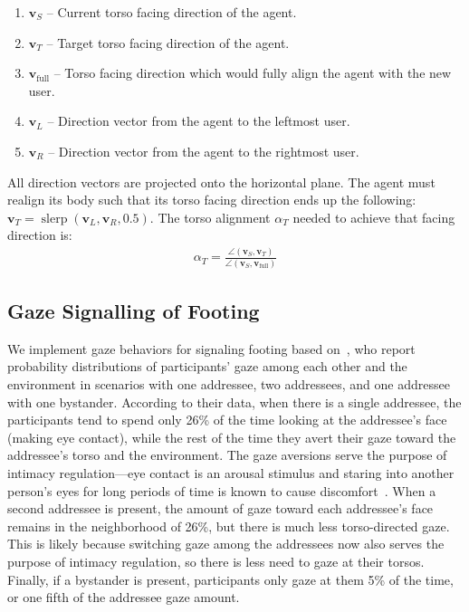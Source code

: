 \begin{enumerate}
\item $\mathbf{v}_S$ -- Current torso facing direction of the agent.
\item $\mathbf{v}_T$ -- Target torso facing direction of the agent.
\item $\mathbf{v}_\mathrm{full}$ -- Torso facing direction which would fully align the agent with the new user.
\item $\mathbf{v}_L$ -- Direction vector from the agent to the leftmost user.
\item $\mathbf{v}_R$ -- Direction vector from the agent to the rightmost user.
\end{enumerate}

All direction vectors are projected onto the horizontal plane. The agent must realign its body such that its torso facing direction ends up the following: $\mathbf{v}_T = \mathop{slerp}(\mathbf{v}_L, \mathbf{v}_R, 0.5)$. The torso alignment $\alpha_T$ needed to achieve that facing direction is:
%
\begin{align} \label{eq:FTorsoAlign}
\alpha_T = \frac{\angle(\mathbf{v}_S, \mathbf{v}_T)}{\angle(\mathbf{v}_S, \mathbf{v}_\mathrm{full})}
\end{align}
%

\subsection{Gaze Signalling of Footing}

We implement gaze behaviors for signaling footing based on~\citet{mutlu2012conversational}, who report probability distributions of participants' gaze among each other and the environment in scenarios with one addressee, two addressees, and one addressee with one bystander. According to their data, when there is a single addressee, the participants tend to spend only 26\% of the time looking at the addressee's face (making eye contact), while the rest of the time they avert their gaze toward the addressee's torso and the environment. The gaze aversions serve the purpose of intimacy regulation---eye contact is an arousal stimulus and staring into another person's eyes for long periods of time is known to cause discomfort~\citep{argyle1976gaze}. When a second addressee is present, the amount of gaze toward each addressee's face remains in the neighborhood of 26\%, but there is much less torso-directed gaze. This is likely because switching gaze among the addressees now also serves the purpose of intimacy regulation, so there is less need to gaze at their torsos. Finally, if a bystander is present, participants only gaze at them 5\% of the time, or one fifth of the addressee gaze amount.


